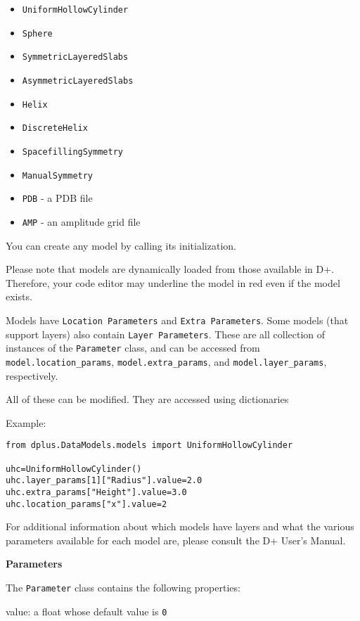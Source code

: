 \documentclass[../D+Manual.tex]{subfiles}
\begin{document}
\begin{itemize}
	\tightlist
	\item
	\texttt{UniformHollowCylinder}
	\item
	\texttt{Sphere}
	\item
	\texttt{SymmetricLayeredSlabs}
	\item
	\texttt{AsymmetricLayeredSlabs}
	\item
	\texttt{Helix}
	\item
	\texttt{DiscreteHelix}
	\item
	\texttt{SpacefillingSymmetry}
	\item
	\texttt{ManualSymmetry}
	\item
	\texttt{PDB} - a PDB file
	\item
	\texttt{AMP} - an amplitude grid file
\end{itemize}

You can create any model by calling its initialization.

Please note that models are dynamically loaded from those available in D+. 
Therefore, your code editor may underline the model in red even if the model exists.

Models have \texttt{Location Parameters} and \texttt{Extra Parameters}. Some models (that support layers) also contain \texttt{Layer Parameters}.
These are all collection of instances of the \texttt{Parameter} class, and can be accessed from 
\texttt{model.location\_params}, \texttt{model.extra\_params}, and \texttt{model.layer\_params}, respectively.

All of these can be modified. They are accessed using dictionaries

Example:

\begin{lstlisting}[style=pythonstyle]
from dplus.DataModels.models import UniformHollowCylinder

uhc=UniformHollowCylinder()
uhc.layer_params[1]["Radius"].value=2.0
uhc.extra_params["Height"].value=3.0
uhc.location_params["x"].value=2
\end{lstlisting}


For additional information about which models have layers and what the various parameters available for each model are, please consult the D+ User's Manual.

\textbf{Parameters}

The \texttt{Parameter} class contains the following properties:

value: a float whose default value is \texttt{0}
\end{document}

